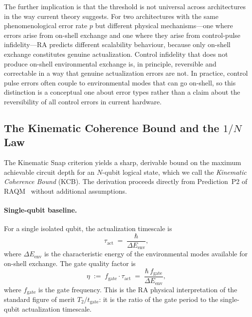 \documentclass[11pt,a4paper]{article}
\theoremstyle{plain}
\theoremstyle{definition}
\theoremstyle{remark}
\begin{document}
The further implication is that the threshold is not universal across
architectures in the way current theory suggests. For two architectures with the
same phenomenological error rate $p$ but different physical mechanisms---one
where errors arise from on-shell exchange and one where they arise from
control-pulse infidelity---RA predicts different scalability behaviour, because
only on-shell exchange constitutes genuine actualization. Control infidelity that
does not produce on-shell environmental exchange is, in principle, reversible and
correctable in a way that genuine actualization errors are not. In practice,
control pulse errors often couple to environmental modes that can go on-shell, so
this distinction is a conceptual one about error types rather than a claim about
the reversibility of all control errors in current hardware.

\subsection{The Kinematic Coherence Bound and the $1/N$ Law}
\label{sec:kcb}

The Kinematic Snap criterion yields a sharp, derivable bound on the maximum
achievable circuit depth for an $N$-qubit logical state, which we call the
\emph{Kinematic Coherence Bound} (KCB). The derivation proceeds directly from
Prediction~P2 of RAQM~\citep{Sandeman2026a} without additional assumptions.

\paragraph{Single-qubit baseline.}
For a single isolated qubit, the actualization timescale is
\begin{equation}
  \tau_{\mathrm{act}} \;=\; \frac{\hbar}{\Delta E_{\mathrm{env}}},
  \label{eq:tau1}
\end{equation}
where $\Delta E_{\mathrm{env}}$ is the characteristic energy of the environmental
modes available for on-shell exchange. The gate quality factor is
\begin{equation}
  \eta \;:=\; f_{\mathrm{gate}} \cdot \tau_{\mathrm{act}}
        \;=\; \frac{\hbar \, f_{\mathrm{gate}}}{\Delta E_{\mathrm{env}}},
  \label{eq:eta}
\end{equation}
where $f_{\mathrm{gate}}$ is the gate frequency. This is the RA physical
interpretation of the standard figure of merit $T_2 / t_{\mathrm{gate}}$: it is
the ratio of the gate period to the single-qubit actualization timescale.
\end{document}
